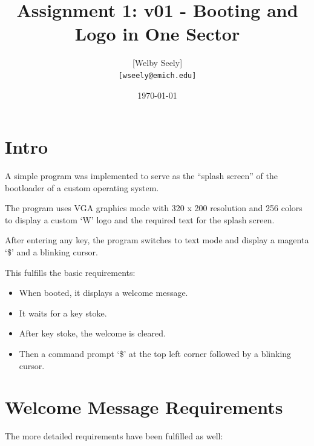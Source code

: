 \documentclass{article}
\title{Assignment 1: v01 - Booting and Logo in One Sector}
\author{
    [Welby Seely] \\
    \texttt{[wseely@emich.edu]}
}
\date{\today}
\begin{document}
    \maketitle
    \section{Intro}\label{sec:intro}
    A simple program was implemented to serve as the ``splash screen'' of the bootloader of a custom
    operating system.

    The program uses VGA graphics mode with 320 x 200 resolution and 256 colors to display a
    custom `W' logo and the required text for the splash screen.

    After entering any key, the program switches to text mode and display a magenta `\$' and a
    blinking cursor.

    This fulfills the basic requirements:

    \begin{itemize}
        \item When booted, it displays a welcome message.
        \item It waits for a key stoke.
        \item After key stoke, the welcome is cleared.
        \item Then a command prompt `\$' at the top left corner followed by a blinking cursor.
    \end{itemize}

    \section{Welcome Message Requirements}\label{sec:reqs}
    The more detailed requirements have been fulfilled as well:
\end{document}
